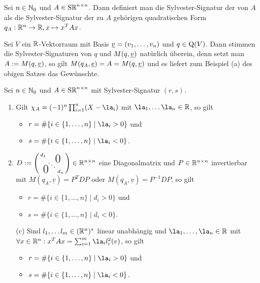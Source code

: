 \documentclass[../../main.tex]{subfiles}
\begin{document}
\begin{df}\label{14.1.3}
    Sei $n\in \mathbb N_0$ und $A\in \operatorname{S\mathbb R}^{n\times n}$. Dann definiert man die Sylvester-Signatur der von $A$ als die Sylvester-Signatur der zu $A$ gehörigen quadratischen Form $q_A: \mathbb R^n\to \mathbb R, x\mapsto x^TAx$.
\end{df}
	
\begin{bem}\label{14.1.4}
    Sei $V$ ein $\mathbb R$-Vektorraum mit Basis ${\underline v}=(v_1,\ldots ,v_n)$ und $q\in\operatorname{Q}(V)$. Dann stimmen die Sylvester-Signaturen von $q$ und $M(q,{\underline v})$ natürlich überein, denn setzt man $A:=M(q,{\underline v})$, so gilt $M(q_A,{\underline e})=A=M(q,{\underline v} )$ und es liefert zum Beispiel (a) des obigen Satzes das Gewünschte.
\end{bem}

\begin{kor}\label{14.1.5}
    Sei $n\in \mathbb N_0$ und $A\in \operatorname{S\mathbb R}^{n\times n}$ mit Sylvester-Signatur $(r,s)$.
    \begin{enumerate}[\normalfont(a)]
        \item Gilt $\chi_A=(-1)^n\prod_{i=1}^n(X-\la_i)$ mit $\la_1,\ldots \la_n\in \R$, so gilt
        \begin{itemize}
            \item $r=\#\{i\in \{1,\ldots ,n\}\mid \la_i>0\}$ und
            \item $s=\#\{i\in \{1,\ldots ,n\}\mid \la_i<0\}$.
        \end{itemize}

        \item $D:=\left(\begin{smallmatrix}
        d_1 & & \llap{$\overset{\blap{\LARGE 0}}{~}$} \\
        & \ddots &\\
        \rlap{\tlap{\LARGE 0}} & & d_n\end{smallmatrix}\right)\in \R^{n\times n}$ eine Diagonalmatrix und $P\in \mathbb R^{n\times n}$ invertierbar mit $M(q_A,\underline{v})=P^TDP$ oder $M(q_A,\underline{v})=P^{-1}DP$, so gilt
        \begin{itemize}
            \item $r=\#\{i\in \{1,\ldots ,n\}\mid d_i>0\}$ und
            \item $s=\#\{i\in \{1,\ldots ,n\}\mid d_i<0\}$.
        \end{itemize}
    
        \item[(c)] Sind $l_1,\ldots l_m\in (\mathbb R^n)^*$ linear unabhängig und $\la_1,\ldots ,\la_n\in \R$ mit $\forall x\in \R^n: x^TAx=\sum_{i=1}^m\la_il_i^2(v)$, so gilt
        \begin{itemize}
            \item $r=\#\{i\in \{1,\ldots ,n\}\mid \la_i>0\}$ und
            \item $s=\#\{i\in \{1,\ldots ,n\}\mid \la_i<0\}$.
        \end{itemize}
    \end{enumerate}
\end{kor}
\end{document}

